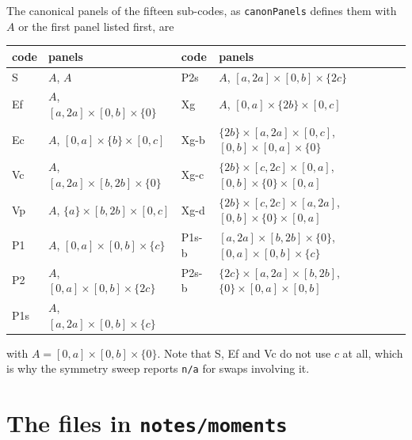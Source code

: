 \documentclass[11pt]{article}
\theoremstyle{remark}
\newcommand{\code}[1]{\texttt{#1}}
\begin{document}
The canonical panels of the fifteen sub-codes, as \code{canonPanels} defines them with
$A$ or the first panel listed first, are
\begin{center}\small
\begin{tabular}{@{}ll@{\hskip 2em}ll@{}}
\toprule
code & panels & code & panels\\
\midrule
S     & $A$, $A$ & P2s   & $A$, $[a,2a]\times[0,b]\times\{2c\}$\\
Ef    & $A$, $[a,2a]\times[0,b]\times\{0\}$ & Xg & $A$, $[0,a]\times\{2b\}\times[0,c]$\\
Ec    & $A$, $[0,a]\times\{b\}\times[0,c]$  & Xg-b & $\{2b\}\times[a,2a]\times[0,c]$, $[0,b]\times[0,a]\times\{0\}$\\
Vc    & $A$, $[a,2a]\times[b,2b]\times\{0\}$ & Xg-c & $\{2b\}\times[c,2c]\times[0,a]$, $[0,b]\times\{0\}\times[0,a]$\\
Vp    & $A$, $\{a\}\times[b,2b]\times[0,c]$  & Xg-d & $\{2b\}\times[c,2c]\times[a,2a]$, $[0,b]\times\{0\}\times[0,a]$\\
P1    & $A$, $[0,a]\times[0,b]\times\{c\}$   & P1s-b & $[a,2a]\times[b,2b]\times\{0\}$, $[0,a]\times[0,b]\times\{c\}$\\
P2    & $A$, $[0,a]\times[0,b]\times\{2c\}$  & P2s-b & $\{2c\}\times[a,2a]\times[b,2b]$, $\{0\}\times[0,a]\times[0,b]$\\
P1s   & $A$, $[a,2a]\times[0,b]\times\{c\}$  & & \\
\bottomrule
\end{tabular}
\end{center}
\noindent
with $A = [0,a]\times[0,b]\times\{0\}$. Note that S, Ef and Vc do not use $c$ at all, which
is why the symmetry sweep reports \code{n/a} for swaps involving it.

\section{The files in \code{notes/moments}}
\label{app:files}
\end{document}
